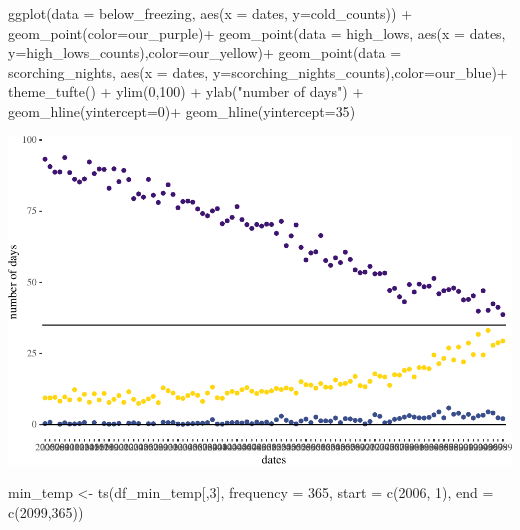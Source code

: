 \documentclass[
  paper=a4,
  ,captions=tableheading
]{scrartcl}
\newenvironment{Shaded}{\begin{snugshade}}{\end{snugshade}}
\newcommand{\AttributeTok}[1]{\textcolor[rgb]{0.77,0.63,0.00}{#1}}
\newcommand{\DecValTok}[1]{\textcolor[rgb]{0.00,0.00,0.81}{#1}}
\newcommand{\FunctionTok}[1]{\textcolor[rgb]{0.00,0.00,0.00}{#1}}
\newcommand{\NormalTok}[1]{#1}
\newcommand{\OtherTok}[1]{\textcolor[rgb]{0.56,0.35,0.01}{#1}}
\newcommand{\SpecialCharTok}[1]{\textcolor[rgb]{0.00,0.00,0.00}{#1}}
\newcommand{\StringTok}[1]{\textcolor[rgb]{0.31,0.60,0.02}{#1}}
\begin{document}
\begin{Shaded}
\begin{Highlighting}[]
  \FunctionTok{ggplot}\NormalTok{(}\AttributeTok{data =}\NormalTok{ below\_freezing, }\FunctionTok{aes}\NormalTok{(}\AttributeTok{x =}\NormalTok{ dates, }\AttributeTok{y=}\NormalTok{cold\_counts)) }\SpecialCharTok{+}
           \FunctionTok{geom\_point}\NormalTok{(}\AttributeTok{color=}\NormalTok{our\_purple)}\SpecialCharTok{+}
    \FunctionTok{geom\_point}\NormalTok{(}\AttributeTok{data =}\NormalTok{ high\_lows, }\FunctionTok{aes}\NormalTok{(}\AttributeTok{x =}\NormalTok{ dates, }\AttributeTok{y=}\NormalTok{high\_lows\_counts),}\AttributeTok{color=}\NormalTok{our\_yellow)}\SpecialCharTok{+}
    \FunctionTok{geom\_point}\NormalTok{(}\AttributeTok{data =}\NormalTok{ scorching\_nights, }\FunctionTok{aes}\NormalTok{(}\AttributeTok{x =}\NormalTok{ dates, }\AttributeTok{y=}\NormalTok{scorching\_nights\_counts),}\AttributeTok{color=}\NormalTok{our\_blue)}\SpecialCharTok{+}
  \FunctionTok{theme\_tufte}\NormalTok{() }\SpecialCharTok{+}
    \FunctionTok{ylim}\NormalTok{(}\DecValTok{0}\NormalTok{,}\DecValTok{100}\NormalTok{) }\SpecialCharTok{+} 
    \FunctionTok{ylab}\NormalTok{(}\StringTok{"number of days"}\NormalTok{) }\SpecialCharTok{+}
  \FunctionTok{geom\_hline}\NormalTok{(}\AttributeTok{yintercept=}\DecValTok{0}\NormalTok{)}\SpecialCharTok{+}
  \FunctionTok{geom\_hline}\NormalTok{(}\AttributeTok{yintercept=}\DecValTok{35}\NormalTok{)}
\end{Highlighting}
\end{Shaded}

\includegraphics{Haskell_files/figure-latex/unnamed-chunk-52-1.pdf}

\begin{Shaded}
\begin{Highlighting}[]
\NormalTok{min\_temp }\OtherTok{\textless{}{-}} \FunctionTok{ts}\NormalTok{(df\_min\_temp[,}\DecValTok{3}\NormalTok{], }\AttributeTok{frequency =} \DecValTok{365}\NormalTok{, }\AttributeTok{start =} \FunctionTok{c}\NormalTok{(}\DecValTok{2006}\NormalTok{, }\DecValTok{1}\NormalTok{), }\AttributeTok{end =} \FunctionTok{c}\NormalTok{(}\DecValTok{2099}\NormalTok{,}\DecValTok{365}\NormalTok{))}
\end{Highlighting}
\end{Shaded}
\end{document}
